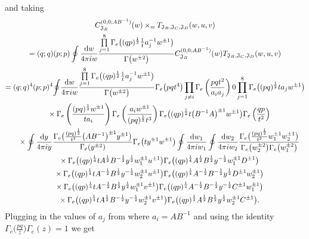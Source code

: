 \documentclass[a4paper,12pt]{article}
\begin{document}
 and taking
\begin{gather*}
C^{(0,0;AB^{-1})}_{{\mathfrak J}_B}(w)\times_w T_{{\mathfrak J}_B,{\mathfrak J}_C,{\mathfrak J}_D}(w,u,v)
\\
=(q;q)(p;p)\oint\frac{{\rm d}w}{4\pi i w} \frac{\prod\limits_{j=1}^8\Gamma_e\big((q p)^{\frac12 }\frac1t a_j^{-1} w^{\pm1}\big)}{\Gamma\big(w^{\pm2}\big)} C^{(0,0;AB^{-1})}_{{\mathfrak J}_B}(w)T_{{\mathfrak J}_B,{\mathfrak J}_C,{\mathfrak J}_D}(w,u,v)
\\
=(q;q)^4(p;p)^4\!\oint\!\frac{{\rm d}w}{4\pi i w} \frac{\prod\limits_{j=1}^8\Gamma_e\big((q p)^{\frac12 }\frac1t a_j^{-1} w^{\pm1}\big)}{\Gamma\big(w^{\pm2}\big)}
\Gamma_e\big(pqt^4\big)\prod_{j\neq i}\Gamma_e\left(\frac{pqt^2}{a_ia_j}\right)0
\prod_{j=1}^8\Gamma_e\big((pq)^{\frac{1}{2}}ta_jw^{\pm1}\big)\\
\quad{}\times\Gamma_e\left(\frac{(pq)^{\frac{1}{2}}w^{\pm1}}{ta_i}\right)\Gamma_e\left(\frac{a_iw^{\pm1}}{(pq)^{\frac{1}{2}}t^3}\right)
 \Gamma_e\big((q p)^{\frac12} t\big(B^{-1}A\big)^{\pm1} w^{\pm1}\big)\Gamma_e\left(\frac{q p}{t^2}\right) \\
\quad{}\times\oint \frac{{\rm d}y}{4\pi i y} \frac{\Gamma_e\big(\frac{(p q)^{\frac12}}{t^2}\big(A B^{-1}\big)^{\pm1}y^{\pm1}\big)}{\Gamma_e(y^{\pm2})}
\Gamma_e\big(t y^{\pm1} w^{\pm1}\big)\oint\frac{{\rm d}w_1}{4\pi i w_1}\oint \frac{{\rm d}w_2}{4\pi i w_2} \frac{\Gamma_e\big(\frac{(p q)^{\frac12}}{t^2}w_1^{\pm1}w_2^{\pm1}\big)}{\Gamma_e\big(w_2^{\pm2}\big)\Gamma_e\big(w_1^{\pm2}\big)} \\
\quad{}\times\Gamma_e\big( (q p)^{\frac14}t A^{\frac12}B^{-\frac12} y^{\frac12} w_1^{\pm1}u^{\pm1}\big)
\Gamma_e\big((qp)^{\frac14} A^{\frac12} B^{\frac12} y^{-\frac12} w_1^{\pm1}D^{\pm1}\big)\\
\quad{}\times \Gamma_e\big((q p)^{\frac14} t A^{-\frac12} B^{\frac12} y^{-\frac12} w_2^{\pm1} u^{\pm1}\big)
\Gamma_e \big((q p)^{\frac14} A^{-\frac12} B^{-\frac12} y^{\frac12} D^{\pm1}w_2^{\pm1}\big)\\
\quad{}\times
\Gamma_e\big((q p)^{\frac14} t A^{-\frac12} B^\frac12 y^\frac12 w_1^{\pm1} v^{\pm1}\big)\Gamma_e\big( ( q p)^{\frac14} A^{-\frac12} B^{-\frac12} y^{-\frac12} C^{\pm1} w_1^{\pm1}\big) \\
\quad{} \times\Gamma_e\big( ( q p )^{\frac14} t A^{\frac12} B^{-\frac12} y^{-\frac12} w_2^{\pm1} v^{\pm1}\big)\Gamma_e\big( ( q p )^{\frac14} A^{\frac12} B^\frac12 y^\frac12 w_2^{\pm1} C^{\pm1}\big) .
\end{gather*}
Plugging in the values of $a_j$ from where $a_i=AB^{-1}$ and using the identity $\Gamma_e\big(\frac{pq}{z}\big)\Gamma_e(z)=1$ we get
\end{document}
